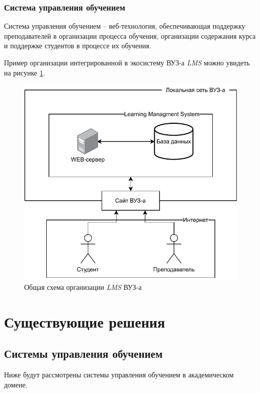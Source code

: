 \subsubsection{Система управления обучением}

Система управления обучением -- веб-технология, обеспечивающая поддержку преподавателей в организации процесса обучения, организации содержания курса и поддержке студентов в процессе их обучения\cite{lms-conference}. 

Пример организации интегрированной в экосистему ВУЗ-а \textit{LMS} можно увидеть на рисунке \ref{fig:LMS}.

\begin{figure}[h!btp]
	\centering
	\includegraphics[width=420pt]{inc/LMS.pdf}
	\caption{Общая схема организации \textit{LMS} ВУЗ-а}
	\label{fig:LMS}	
\end{figure}

\clearpage

\section{Существующие решения}

\subsection{Системы управления обучением}

Ниже будут рассмотрены системы управления обучением в академическом домене.

